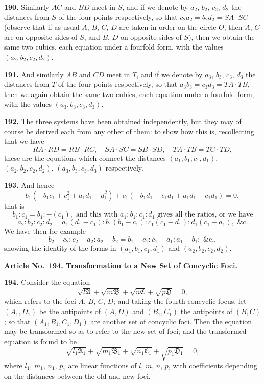 \documentclass[12pt,a4paper]{article}
\theoremstyle{definition}
\begin{document}
\noindent\textbf{190.} Similarly $AC$ and $BD$ meet in $S$, and if we denote by $a_2$, $b_2$, $c_2$, $d_2$ the
distances from $S$ of the four points respectively, so that $c_2a_2 = b_2d_2 = SA \cdot SC$ (observe
that if as usual $A$, $B$, $C$, $D$ are taken in order on the circle $O$, then $A$, $C$ are on
opposite sides of $S$, and $B$, $D$ on opposite sides of $S$), then we obtain the same
two cubics, each equation under a fourfold form, with the values $(a_2, b_2, c_2, d_2)$.

\noindent\textbf{191.} And similarly $AB$ and $CD$ meet in $T$, and if we denote by $a_3$, $b_3$, $c_3$, $d_3$
the distances from $T$ of the four points respectively, so that $a_3b_3 = c_3d_3 = TA \cdot TB$,
then we again obtain the same two cubics, each equation under a fourfold form, with
the values $(a_3, b_3, c_3, d_3)$.

\noindent\textbf{192.} The three systems have been obtained independently, but they may of
course be derived each from any other of them: to show how this is, recollecting that
we have
\[
RA \cdot RD = RB \cdot RC, \quad SA \cdot SC = SB \cdot SD, \quad TA \cdot TB = TC \cdot TD,
\]
these are the equations which connect the distances $(a_1, b_1, c_1, d_1)$, $(a_2, b_2, c_2, d_2)$,
$(a_3, b_3, c_3, d_3)$ respectively.

\newpage
\noindent\textbf{193.} And hence
\[
b_1(-b_1c_1 + c_1^2 + a_1d_1 - d_1^2) + c_1(-b_1d_1 + c_1d_1 + a_1d_1 - c_1d_1) = 0,
\]
that is
\[
b_1 : c_1 = b_1 : -(c_1), \text{ and this with } a_1 : b_1 : c_1 : d_1 \text{ gives all the ratios, or we have}
\]
\[
a_2 : b_2 : c_2 : d_2 = a_1(d_1 - c_1) : b_1(b_1 - c_1) : c_1(c_1 - d_1) : d_1(c_1 - a_1), \text{ \&c.}
\]
We have then for example
\[
b_2 - c_2 : c_2 - a_2 : a_2 - b_2 = b_1 - c_1 : c_1 - a_1 : a_1 - b_1; \text{ \&c.},
\]
showing the identity of the forms in $(a_1, b_1, c_1, d_1)$ and $(a_2, b_2, c_2, d_2)$.

\vspace{0.5em}
\noindent\textbf{Article No.~194. Transformation to a New Set of Concyclic Foci.}

\vspace{0.3em}
\noindent\textbf{194.} Consider the equation
\[
\sqrt{l\mathfrak{A}} + \sqrt{m\mathfrak{B}} + \sqrt{n\mathfrak{C}} + \sqrt{p\mathfrak{D}} = 0,
\]
which refers to the foci $A$, $B$, $C$, $D$; and taking the fourth concyclic focus, let $(A_1, D_1)$
be the antipoints of $(A, D)$ and $(B_1, C_1)$ the antipoints of $(B, C)$; so that $(A_1, B_1, C_1, D_1)$
are another set of concyclic foci. Then the equation may be transformed so as to
refer to the new set of foci; and the transformed equation is found to be
\[
\sqrt{l_1\mathfrak{A}_1} + \sqrt{m_1\mathfrak{B}_1} + \sqrt{n_1\mathfrak{C}_1} + \sqrt{p_1\mathfrak{D}_1} = 0,
\]
where $l_1$, $m_1$, $n_1$, $p_1$ are linear functions of $l$, $m$, $n$, $p$, with coefficients depending on the
distances between the old and new foci.
\end{document}
